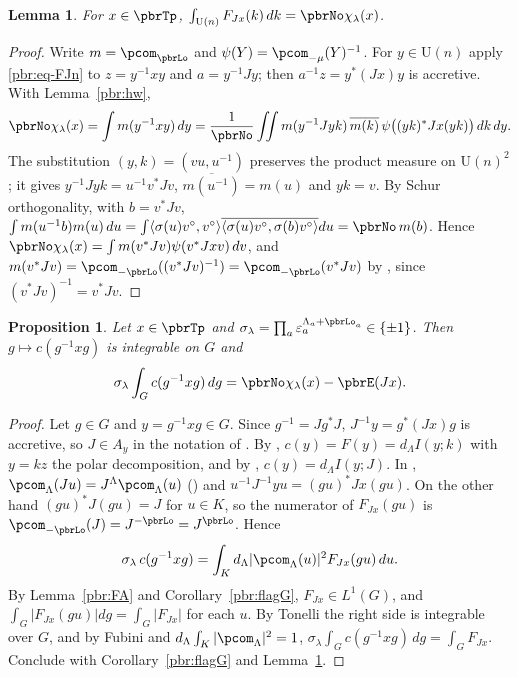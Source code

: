 \documentclass[10pt]{amsart}
\newtheorem{proposition}[theorem]{Proposition}
\newtheorem{lemma}[theorem]{Lemma}
\theoremstyle{definition}
\theoremstyle{remark}
\providecommand{\auU}{\mathrm U}
\providecommand{\aubar}[1]{\overline{#1}}
\begin{document}
\begin{lemma}\label{pbr:Un}
For $x\in\pbrTp$, $\int_{\auU(n)}F_{Jx}(k)\,dk=\pbrNo\chi_\lambda(x)$.
\end{lemma}
\begin{proof}
Write $m=\pcom_{\pbrLo}$ and $\psi(Y)=\pcom_{-\mu}(Y)^{-1}$. For $y\in\auU(n)$ apply
\eqref{pbr:eq-FJn} to $z=y^{-1}xy$ and $a=y^{-1}Jy$; then $a^{-1}z=y^*(Jx)y$ is accretive. With
Lemma~\ref{pbr:hw},
\[
\pbrNo\chi_\lambda(x)=\int m(y^{-1}xy)\,dy=\frac1{\pbrNo}\iint m(y^{-1}Jyk)\,\aubar{m(k)}\,
\psi\bigl((yk)^*Jx(yk)\bigr)\,dk\,dy .
\]
The substitution $(y,k)=(vu,u^{-1})$ preserves the product measure on $\auU(n)^2$; it gives
$y^{-1}Jyk=u^{-1}v^*Jv$, $\aubar{m(u^{-1})}=m(u)$ and $yk=v$. By Schur orthogonality, with
$b=v^*Jv$, $\int m(u^{-1}b)m(u)\,du=\int\langle\sigma(u)v^\circ,v^\circ\rangle\allowbreak \aubar{\langle\sigma(u)
v^\circ,\sigma(b)v^\circ\rangle}du=\pbrNo\,m(b)$. Hence $\pbrNo\chi_\lambda(x)=\int m(v^*Jv)\psi(v^*Jxv)
\,dv$, and $m(v^*Jv)=\pcom_{-\pbrLo}((v^*Jv)^{-1})=\pcom_{-\pbrLo}(v^*Jv)$ by
{\cite[Lemma~3.18(a)]{P49}}, since $(v^*Jv)^{-1}=v^*Jv$.
\end{proof}

\begin{proposition}\label{pbr:orbit}
Let $x\in\pbrTp$ and $\sigma_\lambda=\prod_a\varepsilon_a^{\Lambda_a+\pbrLo_a}\in\{\pm1\}$. Then
$g\mapsto c(g^{-1}xg)$ is integrable on $G$ and
\[
\sigma_\lambda\int_Gc(g^{-1}xg)\,dg=\pbrNo\chi_\lambda(x)-\pbrE(Jx).
\]
\end{proposition}
\begin{proof}
Let $g\in G$ and $y=g^{-1}xg\in G$. Since $g^{-1}=Jg^*J$, $J^{-1}y=g^*(Jx)g$ is accretive, so $J\in
A_y$ in the notation of {\cite[\S3.2.4]{P49}}. By {\cite[Theorem~3.17]{P49}}, $c(y)=F(y)=d_\Lambda I(y;k)$
with $y=kz$ the polar decomposition, and by {\cite[Proposition~3.21]{P49}}, $c(y)=d_\Lambda I(y;J)$. In
{\cite[(15)]{P49}}, $\pcom_\Lambda(Ju)=J^\Lambda\pcom_\Lambda(u)$ ({\cite[Corollary~3.19(b)]{P49}}) and
$u^{-1}J^{-1}yu=(gu)^*Jx(gu)$. On the other hand $(gu)^*J(gu)=J$ for $u\in K$, so the numerator of
$F_{Jx}(gu)$ is $\pcom_{-\pbrLo}(J)=J^{-\pbrLo}=J^{\pbrLo}$. Hence
\[
\sigma_\lambda\,c(g^{-1}xg)=\int_Kd_\Lambda|\pcom_\Lambda(u)|^2F_{Jx}(gu)\,du .
\]
By Lemma~\ref{pbr:FA} and Corollary~\ref{pbr:flagG}, $F_{Jx}\in L^1(G)$, and $\int_G|F_{Jx}(gu)|dg=
\int_G|F_{Jx}|$ for each $u$. By Tonelli the right side is integrable over $G$, and by Fubini and
$d_\Lambda\int_K|\pcom_\Lambda|^2=1$, $\sigma_\lambda\int_Gc(g^{-1}xg)\,dg=\int_GF_{Jx}$. Conclude with
Corollary~\ref{pbr:flagG} and Lemma~\ref{pbr:Un}.
\end{proof}
\end{document}
